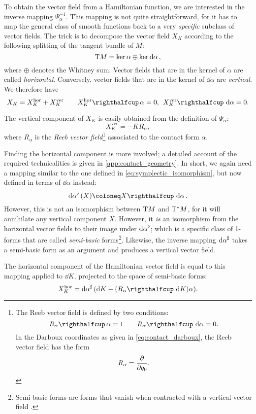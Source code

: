 To obtain the vector field from a Hamiltonian function, we are interested in the inverse mapping $\Psi^{-1}_\alpha$. This mapping is not quite straightforward, for it has to map the general class of smooth functions back to a very \emph{specific} subclass of vector fields. The trick is to decompose the vector field $X_K$ according to the following splitting of the tangent bundle of $M$:
$$ \mathrm{T}M = \ker \alpha \oplus \ker \dd{\alpha}, $$
where $\oplus$ denotes the Whitney sum. Vector fields that are in the kernel of $\alpha$ are called \emph{horizontal}. Conversely, vector fields that are in the kernel of $\dd{\alpha}$ are \emph{vertical}. We therefore have 
$$ X_K = X_K^\text{hor} + X_K^\text{ver} \qquad \intpr{X_K^\text{hor}}{\alpha} = 0,\:\: \intpr{X_K^\text{ver}}{\dd{\alpha}} = 0. $$

The vertical component of $X_K$ is easily obtained from the definition of $\Psi_\alpha$:
\begin{equation}
    X_K^\text{ver} = -K R_\alpha,
    \label{eq:vertical_vf}
\end{equation}
where $R_\alpha$ is the \emph{Reeb vector field}\footnote{
    The Reeb vector field is defined by two conditions: \cite{Libermann1987}
        $$ \intpr{R_\alpha}{\alpha} = 1 \qquad \intpr{R_\alpha}{\dd{\alpha}} = 0.$$
    In the Darboux coordinates as given in \cref{eq:contact_darboux}, the Reeb vector field has the form
        $$ R_\alpha = \pdv{}{q_0}. $$} 
associated to the contact form $\alpha$.

Finding the horizontal component is more involved; a detailed account of the required technicalities is given in \cref{app:contact_geometry}. In short, we again need a mapping similar to the one defined in \cref{eq:symplectic_isomorphism}, but now defined in terms of $\dd{\alpha}$ instead:
$$ \toDual{\dd{\alpha}}(X) \coloneq \intpr{X}{\dd{\alpha}}. $$
However, this is not an isomorphism between $\mathrm{T}M$ and $\mathrm{T}^*M$, for it will annihilate any vertical component $X$. However, it \emph{is} an isomorphism from the horizontal vector fields to their image under $\dd{\alpha}^\flat$; which is a specific class of 1-forms that are called \emph{semi-basic} forms\footnote
{
    Semi-basic forms are forms that vanish when contracted with a vertical vector field \cite{Libermann1987}. 
}. 
Likewise, the inverse mapping $\dd{\alpha}^\sharp$ takes a semi-basic form as an argument and produces a vertical vector field. 

The horizontal component of the Hamiltonian vector field is equal to this mapping applied to $\dd{K}$, projected to the space of semi-basic forms:
\begin{equation}
    X_K^\text{hor} = \fromDual{\dd{\alpha}}\qty(\dd{K} - (\intpr{R_\alpha}{\dd{K}})\alpha).
    \label{eq:horizontal_vf}
\end{equation}

